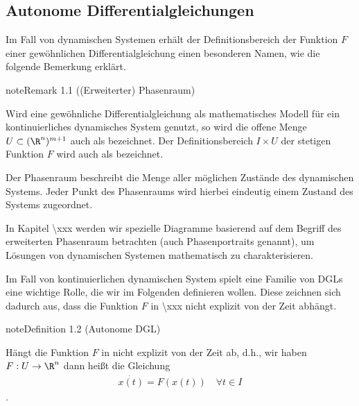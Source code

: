 \documentclass[letterpaper,10pt,english]{jupyterBook}
\begin{document}
\subsection{Autonome Differentialgleichungen}
\label{\detokenize{ode/repetition:autonome-differentialgleichungen}}
Im Fall von dynamischen Systemen erhält der Definitionsbereich der Funktion \(F\) einer gewöhnlichen Differentialgleichung einen besonderen Namen, wie die folgende Bemerkung erklärt.
\label{ode/repetition:remark-1}
\begin{sphinxadmonition}{note}{Remark 1.1 ((Erweiterter) Phasenraum)}



Wird eine gewöhnliche Differentialgleichung als mathematisches Modell für ein kontinuierliches dynamisches System genutzt, so wird die offene Menge \(U\subset (\R^n)^{m+1}\) auch als  bezeichnet.
Der Definitionsbereich \(I\times U\) der stetigen Funktion \(F\) wird auch als  bezeichnet.

Der Phasenraum beschreibt die Menge aller möglichen Zustände des dynamischen Systems.
Jeder Punkt des Phasenraums wird hierbei eindeutig einem Zustand des Systems zugeordnet.

In Kapitel \textbackslash{}xxx werden wir spezielle Diagramme basierend auf dem Begriff des erweiterten Phasenraum betrachten (auch Phasenportraits genannt), um Lösungen von dynamischen Systemen mathematisch zu charakterisieren.
\end{sphinxadmonition}

Im Fall von kontinuierlichen dynamischen System spielt eine Familie von DGLs eine wichtige Rolle, die wir im Folgenden definieren wollen.
Diese zeichnen sich dadurch aus, dass die Funktion \(F\) in \textbackslash{}xxx nicht explizit von der Zeit abhängt.
\label{ode/repetition:definition-2}
\begin{sphinxadmonition}{note}{Definition 1.2 (Autonome DGL)}



Hängt die Funktion \(F\) in {\hyperref[\detokenize{ode/repetition:def:DGL}]{}} nicht explizit von der Zeit ab, d.h., wir haben \(F:U\rightarrow\R^n\) dann heißt die Gleichung
\begin{equation}\label{equation:ode/repetition:eq:autonome_DGL}
\begin{split}\dot{x(t)} = F(x(t))\quad\forall t\in I\end{split}
\end{equation}
.
\end{sphinxadmonition}
\end{document}
